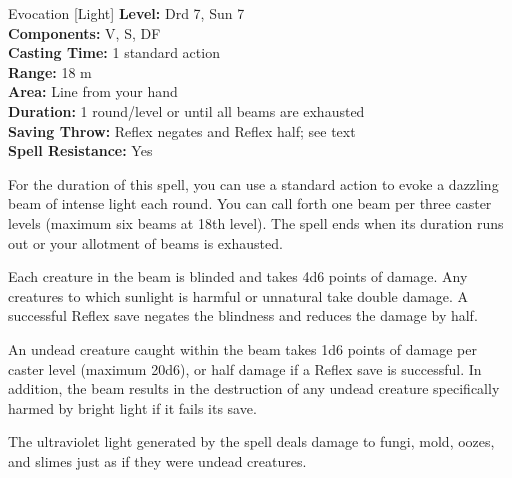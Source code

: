 {Evocation [Light]}
{
	\textbf{Level:}
	Drd 7, Sun 7\\
	\textbf{Components:}
	V, S, DF\\
	\textbf{Casting Time:}
	1 standard action\\
	\textbf{Range:}
	18 m\\
	\textbf{Area:}
	Line from your hand\\
	\textbf{Duration:}
	1 round/level or until all beams are exhausted\\
	\textbf{Saving Throw:}
	Reflex negates and Reflex half; see text\\
	\textbf{Spell Resistance:}
	Yes\\
}
{
	For the duration of this spell, you can use a standard action to evoke a dazzling beam of intense light each round. You can call forth one beam per three caster levels (maximum six beams at 18th level). The spell ends when its duration runs out or your allotment of beams is exhausted.

	Each creature in the beam is blinded and takes 4d6 points of damage. Any creatures to which sunlight is harmful or unnatural take double damage. A successful Reflex save negates the blindness and reduces the damage by half.

	An undead creature caught within the beam takes 1d6 points of damage per caster level (maximum 20d6), or half damage if a Reflex save is successful. In addition, the beam results in the destruction of any undead creature specifically harmed by bright light if it fails its save.

	The ultraviolet light generated by the spell deals damage to fungi, mold, oozes, and slimes just as if they were undead creatures.

}
